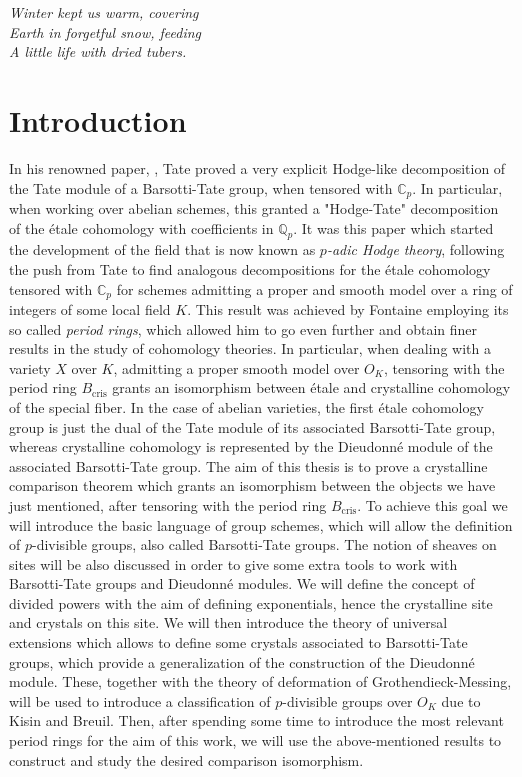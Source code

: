\begin{flushright}
	{\em Winter kept us warm, covering\\
	Earth in forgetful snow, feeding\\
	A little life with dried tubers.}\\
\end{flushright} 
\newpage

{}
\section*{Introduction}
In his renowned paper, \cite{TatePC}, Tate proved a very explicit Hodge-like decomposition
of the Tate module of a Barsotti-Tate group, when tensored with $\mathbb{C}_p$.
In particular, when working over abelian schemes, this granted a "Hodge-Tate"
decomposition of the étale cohomology with coefficients in $\mathbb{Q}_p$.
It was this paper which started the development of the field that is now known as {\em $p$-adic Hodge theory},
following the push from Tate to find analogous decompositions for the étale cohomology
tensored with $\mathbb{C}_p$ for schemes admitting a proper and smooth model over
a ring of integers of some local field $K$.
This result was achieved by Fontaine employing its so called {\em period rings},
which allowed him to go even further and obtain finer results in the
study of cohomology theories.
In particular, when dealing with a variety $X$ over $K$, admitting
a proper smooth model over $O_K$, tensoring with the period ring $B_{\mathrm{cris}}$
grants an isomorphism between étale and crystalline cohomology of the special fiber.
In the case of abelian varieties, the first étale cohomology group is just the dual
of the Tate module of its associated Barsotti-Tate group,
whereas crystalline cohomology is represented by the Dieudonné module
of the associated Barsotti-Tate group.
The aim of this thesis is to prove a crystalline comparison theorem which
grants an isomorphism between the objects we have just mentioned, after tensoring
with the period ring $B_{\mathrm{cris}}$.
To achieve this goal we will introduce the basic language of group schemes, which
will allow the definition of $p$-divisible groups, also called Barsotti-Tate groups.
The notion of sheaves on sites will be also discussed in order to give some
extra tools to work with Barsotti-Tate groups and Dieudonné modules.
We will define the concept of divided powers with the aim
of defining exponentials, hence the crystalline site and crystals on this site.
We will then introduce the theory of universal extensions which allows
to define some crystals associated to Barsotti-Tate groups,
which provide a generalization of the construction of the Dieudonné module.
These, together with the theory of deformation of Grothendieck-Messing,
will be used to introduce a classification
of $p$-divisible groups over $O_K$ due to Kisin and Breuil.
Then, after spending some time to introduce the most relevant period rings
for the aim of this work, we will use the above-mentioned results
to construct and study the desired comparison isomorphism.



